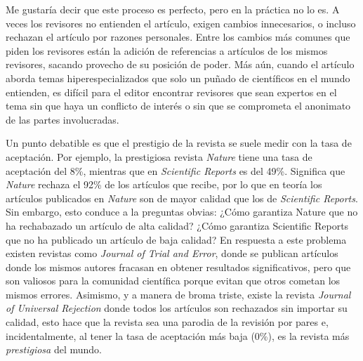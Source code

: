 Me gustaría decir que este proceso es perfecto, pero en la práctica no lo es.
A veces los revisores no entienden el artículo, exigen cambios innecesarios, o incluso rechazan el artículo por razones personales.
Entre los cambios más comunes que piden los revisores están la adición de referencias a artículos de los mismos revisores, sacando provecho de su posición de poder.
Más aún, cuando el artículo aborda temas hiperespecializados que solo un puñado de científicos en el mundo entienden, es difícil para el editor encontrar revisores que sean expertos en el tema sin que haya un conflicto de interés o sin que se comprometa el anonimato de las partes involucradas.

Un punto debatible es que el prestigio de la revista se suele medir con la tasa de aceptación.
Por ejemplo, la prestigiosa revista \emph{Nature} tiene una tasa de aceptación del 8\%, mientras que en \emph{Scientific Reports} es del 49\%.
Significa que \emph{Nature} rechaza el 92\% de los artículos que recibe, por lo que en teoría los artículos publicados en \emph{Nature} son de mayor calidad que los de \emph{Scientific Reports}.
Sin embargo, esto conduce a la preguntas obvias: ¿Cómo garantiza Nature que no ha rechabazado un artículo de alta calidad?
¿Cómo garantiza Scientific Reports que no ha publicado un artículo de baja calidad?
En respuesta a este problema existen revistas como \emph{Journal of Trial and Error}, donde se publican artículos donde los mismos autores fracasan en obtener resultados significativos, pero que son valiosos para la comunidad científica porque evitan que otros cometan los mismos errores.
Asimismo, y a manera de broma triste, existe la revista \emph{Journal of Universal Rejection} donde todos los artículos son rechazados sin importar su calidad, esto hace que la revista sea una parodia de la revisión por pares e, incidentalmente, al tener la tasa de aceptación más baja (0\%), es la revista más \emph{prestigiosa} del mundo.

